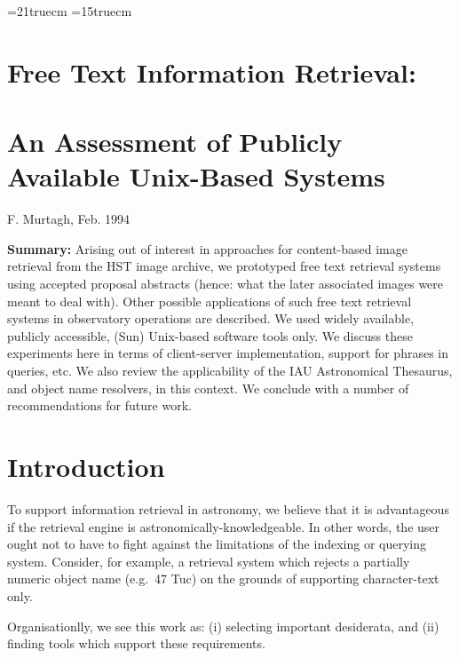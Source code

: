 \textheight=21truecm            %
\textwidth=15truecm             %


\section*{Free Text Information Retrieval:}

\section*{An Assessment of Publicly Available Unix-Based Systems}

\bigskip

\bigskip

F. Murtagh, Feb. 1994

\bigskip

\bigskip

{\bf Summary:} Arising out of interest in approaches for content-based
image retrieval from the HST image archive, we prototyped free text
retrieval systems using accepted proposal abstracts (hence: what the 
later associated images were meant to deal with).  Other possible 
applications of such free text retrieval systems 
in  observatory operations are described.  We used 
widely available, publicly accessible, (Sun) Unix-based  software tools only.
We discuss these experiments here in terms of client-server implementation, 
support for phrases in queries, etc.  We also review the applicability of the
IAU Astronomical Thesaurus, and object name resolvers, in this context.  We 
conclude with a number of recommendations for future work.

\section{Introduction}

To support information retrieval in astronomy, we believe that it is 
advantageous if the retrieval engine is astronomically-knowledgeable.  
In other words, the user ought not to have to fight against the limitations
of the indexing or querying system.  Consider, for example, a retrieval 
system which rejects a partially numeric object name 
(e.g.\ 47 Tuc) on the grounds of supporting character-text only.

Organisationlly, we see this work as: (i) selecting important desiderata,
and (ii) finding tools which support these requirements.

